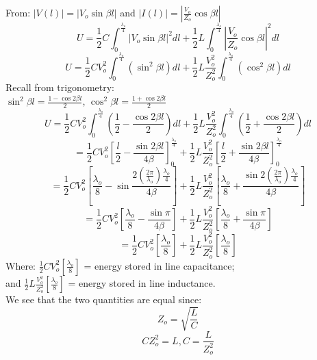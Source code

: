   From: $ | V(l) | = |V_{o}\sin \beta l | $ and $  | I(l) | = \left|\frac{V_{o}}{Z_{o}}\cos \beta l\right |$
  \begin{equation}
  U = \frac{1}{2}C\int_{0}^{\frac{\lambda_{o}}{4}}|V_{o}\sin \beta l |^{2}dl + \frac{1}{2}L\int_{0}^{\frac{\lambda_{o}}{4}}\left|\frac{V_{o}}{Z_{o}}\cos \beta l \right|^{2}dl
  \end{equation}
   \begin{equation}
  U = \frac{1}{2}CV_{o}^{2}\int_{0}^{\frac{\lambda_{o}}{4}}(\sin^{2} \beta l) dl + \frac{1}{2}L\frac{V_{o}^{2}}{Z_{o}^{2}}\int_{0}^{\frac{\lambda_{o}}{4}}( \cos^{2} \beta l) dl    
  \end{equation}
  Recall from trigonometry:\\       
  $\sin^{2} \beta l = \frac{1 - \cos2\beta l}{2}$, $\cos^{2} \beta l = \frac{1 + \cos2\beta l}{2}$
  {\small \begin{equation}
  U = \frac{1}{2}CV_{o}^{2}\int_{0}^{\frac{\lambda_{o}}{4}}\left(\frac{1}{2} - \frac{\cos 2\beta l}{2}\right) dl + \frac{1}{2}L\frac{V_{o}^{2}}{Z_{o}^{2}}\int_{0}^{\frac{\lambda_{o}}{4}} \left
  (\frac{1}{2} + \frac{\cos 2\beta l}{2}\right) dl    
  \end{equation}}
   \begin{equation}
 = \frac{1}{2}CV_{o}^{2}\left[\frac{l}{2} - \frac{\sin 2\beta l}{4 \beta}\right]_{0}^{\frac{\lambda_{o}}{4}}  + \frac{1}{2}L\frac{V_{o}^{2}}{Z_{o}^{2}}\left[\frac{l}{2} + \frac{\sin 2\beta l}{4 \beta}\right]_{0}^{\frac{\lambda_{o}}{4}}
  \end{equation}
    {\small\begin{equation}
  = \frac{1}{2}CV_{o}^{2}\left[\frac{\lambda_{o}}{8} - \sin \frac{2(\frac{2\pi}{\lambda_{o}})\frac{\lambda_{o}}{4} }{4 \beta}\right] + \frac{1}{2}L\frac{V_{o}^{2}}{Z_{o}^{2}}\left[\frac{\lambda_{o}}{8} + \frac{\sin 2(\frac{2\pi}{\lambda_{o}})\frac{\lambda_{o}}{4} }{4 \beta}\right]
  \end{equation}}
   \begin{equation}
  = \frac{1}{2}CV_{o}^{2}\left[\frac{\lambda_{o}}{8} -  \frac{\sin \pi}{4 \beta}\right] + \frac{1}{2}L\frac{V_{o}^{2}}{Z_{o}^{2}}\left[\frac{\lambda_{o}}{8} + \frac{\sin \pi}{4 \beta}\right]
  \end{equation}
   \begin{equation}
  = \frac{1}{2}CV_{o}^{2}\left[\frac{\lambda_{o}}{8}\right] + \frac{1}{2}L\frac{V_{o}^{2}}{Z_{o}^{2}}\left[ \frac{\lambda_{o}}{8} \right]
  \end{equation}
  Where: $\frac{1}{2}CV_{o}^{2}\left[\frac{\lambda_{o}}{8}\right] $ = energy stored in line capacitance;\\
  and  $ \frac{1}{2}L\frac{V_{o}^{2}}{Z_{o}^{2}}\left[ \frac{\lambda_{o}}{8} \right] $ = energy stored in line inductance.\\
  We see that the two quantities are equal since:
  \begin{equation*}
  Z_{o} = \sqrt{\frac{L}{C}}
  \end{equation*}
    \begin{equation*}
  CZ_{o}^{2} = L,
   C= {\frac{L}{Z_{o}^{2}}}
  \end{equation*}
 
